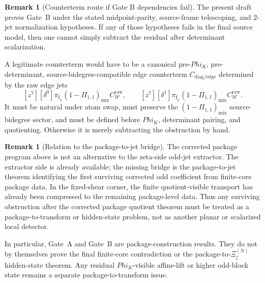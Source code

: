 \documentclass[11pt,a4paper]{amsart}
\def\Phi{Phi}%
\theoremstyle{plain}
\theoremstyle{definition}
\newtheorem{remark}[theorem]{Remark}
\begin{document}
\begin{remark}[Counterterm route if Gate B dependencies fail]
\label{rem:counterterm-route-if-gate-b-dependencies-fail}
The present draft proves Gate~B under the stated midpoint-parity,
source-frame telescoping, and \(2\)-jet normalization hypotheses.  If any
of those hypotheses fails in the final source model, then one cannot
simply subtract the residual after determinant scalarization.

A legitimate counterterm would have to be a canonical pre-\(\Phi_K\),
pre-determinant, source-bidegree-compatible edge counterterm
\(C_{\mathrm{diag}/\mathrm{edge}}\) determined by the raw edge jets
\[
[z^7][\delta^0]\pi_{\mathfrak f_h}
(1-\Pi_{1,1})_{\mathrm{mix}}C_{\mathcal W}^{\mathrm{raw}},
\qquad
[z^7][\delta^1]\pi_{\mathfrak f_h}
(1-\Pi_{1,1})_{\mathrm{mix}}C_{\mathcal W}^{\mathrm{raw}}.
\]
It must be natural under atom swap, must preserve the
\((1-\Pi_{1,1})_{\mathrm{mix}}\) source-bidegree sector, and must be
defined before \(\Phi_K\), determinant pairing, and quotienting.
Otherwise it is merely subtracting the obstruction by hand.
\end{remark}

\begin{remark}[Relation to the package-to-jet bridge]
\label{rem:relation-to-package-to-jet-bridge}
The corrected package program above is not an alternative to the zeta-side
odd-jet extractor.  The extractor side is already available; the missing
bridge is the package-to-jet theorem identifying the first surviving
corrected odd coefficient from finite-core package data.  In the
fixed-shear corner, the finite quotient-visible transport has already been
compressed to the remaining package-level data.  Thus any surviving
obstruction after the corrected package quotient theorem must be treated as
a package-to-transform or hidden-state problem, not as another planar or
scalarized local detector.

In particular, Gate~A and Gate~B are package-construction results.  They do
not by themselves prove the final finite-core contradiction or the
package-to-\(\Xi_\zeta^{(N)}\) hidden-state theorem.  Any residual
\(\Phi_K\)-visible affine-lift or higher odd-block state remains a separate
package-to-transform issue.
\end{remark}
\end{document}
